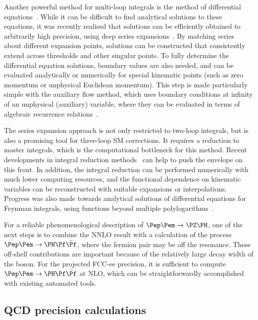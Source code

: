 Another powerful method for multi-loop integrals is the method of differential equations~\cite{Kotikov:1990kg,Kotikov:1991hm,Kotikov:1991pm,Remiddi:1997ny,Henn:2013pwa}. 
While it can be difficult to find analytical solutions to these equations, it was recently realised that solutions can be efficiently obtained 
to arbitrarily high precision, using deep series expansions~\cite{Dubovyk:2022frj,Liu:2021wks,Liu:2022chg,Hidding:2022ycg,Armadillo:2022ugh}. 
By matching series about different expansion points, solutions can be constructed that consistently extend across thresholds and other singular points. 
To fully determine the differential equation solutions, boundary values are also needed, and can be evaluated analytically or numerically for special kinematic points 
(such as zero momentum or unphysical Euclidean momentum). 
This step is made particularly simple with the auxiliary flow method, 
which uses boundary conditions at infinity of an unphysical (auxiliary) variable, 
where they can be evaluated in terms of algebraic recurrence relations~\cite{Liu:2022mfb}.

The series expansion approach is not only restricted to two-loop integrals, but is also a promising tool for three-loop SM corrections. 
It requires a reduction to master integrals, which is the computational bottleneck for this method. 
Recent developments in integral reduction methods~\cite{Klappert:2020nbg,Chestnov:2022alh,Fontana:2023amt} can help to push the envelope on this front. 
In addition, the integral reduction can be performed numerically with much lower computing resources, 
and the functional dependence on kinematic variables can be reconstructed with suitable expansions or interpolations. 
Progress was also made towards analytical solutions of differential equations for Feynman integrals, using functions beyond multiple polylogarithms~\cite{Bourjaily:2022bwx,Pogel:2022ken}.

For a reliable phenomenological description of $\epem \to \PZ\PH$, 
one of the next steps is to combine the NNLO result with a calculation of the process $\epem \to \PH \Pf\bar{\Pf}$, 
where the fermion pair may be off the \PZ resonance. 
These off-shell contributions are important because of the relatively large decay width of the \PZ boson. 
For the projected FCC-ee precision, it is sufficient to compute $\epem \to \PH \Pf\bar{\Pf}$ at NLO, 
which can be straightforwardly accomplished with existing automated tools.

\subsection{QCD precision calculations}
\label{sec:qcdcalc}

